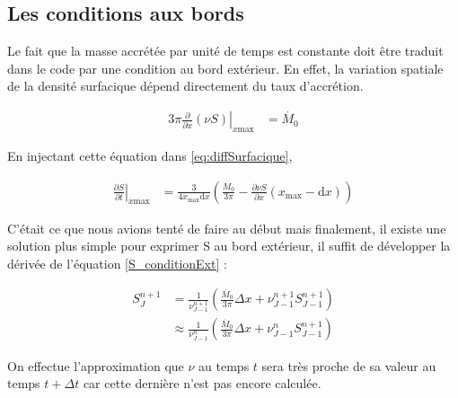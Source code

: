 \documentclass[a4paper,12pt]{article}
\begin{document}

\subsection{Les conditions aux bords}
Le fait que la masse accrétée par unité de temps est constante doit être traduit dans le code par une condition au bord extérieur. En effet, la variation spatiale de la densité surfacique dépend directement du taux d'accrétion.

\begin{align}
\left.3\pi\frac{\partial}{\partial x}\left(\nu S\right)\right|_{x\text{max}} &= \dot{M_0}\label{S_conditionExt}
\end{align}

En injectant cette équation dans \ref{eq:diffSurfacique}, 

\begin{align}
\left.\frac{\partial S}{\partial t}\right|_{x\text{max}} &= \frac{3}{4x_\text{max}\text{d}x}\left(\frac{\dot{M_0}}{3\pi} - \frac{\partial \nu S}{\partial x}(x_\text{max} - \text{d}x) \right)
\end{align}

C'était ce que nous avions tenté de faire au début mais finalement, il existe une solution plus simple pour exprimer S au bord extérieur, il suffit de développer la dérivée de l'équation \ref{S_conditionExt} :

\begin{align}
S^{n+1}_J &= \frac{1}{\nu_{J-1}^{n+1}} \left( \frac{\dot{M_0}}{3\pi}\Delta x + \nu^{n+1}_{J-1}S_{J-1}^{n+1}\right)\\
 &\approx  \frac{1}{\nu_{J-1}^{n}} \left( \frac{\dot{M_0}}{3\pi}\Delta x + \nu^{n}_{J-1}S_{J-1}^{n+1}\right)\label{condExterne}
\end{align}

On effectue l'approximation que $\nu$ au temps $t$ sera très proche de sa valeur au temps $t+\Delta t$ car cette dernière n'est pas encore calculée.
\end{document}
